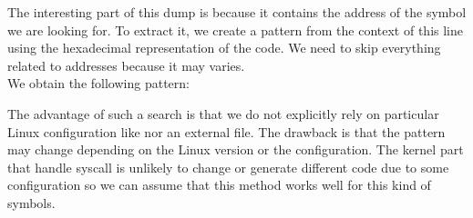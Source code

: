 The interesting part of this dump is 
because it contains the address of the symbol we are looking for.
To extract it, we create a pattern from the context of this line using the
hexadecimal representation of the code. We need to skip everything related to
addresses because it may varies.\\

We obtain the following pattern:\\

The advantage of such a search is that we do not explicitly rely on particular
Linux configuration like  nor an external file. The
drawback is that the pattern may change depending on the Linux version or the
configuration. The kernel part that handle syscall is unlikely to change or
generate different code due to some configuration so we can assume that this
method works well for this kind of symbols.
